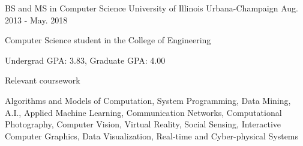 

\begin{cventries}

  \cventry
    {BS and MS in Computer Science} %
    {University of Illinois} %
    {Urbana-Champaign} %
    {Aug. 2013 - May. 2018} %
    {
      \begin{cvitems} %
        \item {Computer Science student in the College of Engineering}
        \item {Undergrad GPA: 3.83, Graduate GPA: 4.00}
      \end{cvitems}
    }

  \cventry
    {Relevant coursework} %
    {} %
    {} %
    {} %
    {
      \begin{cvitems} %
        \item {Algorithms and Models of Computation, System Programming, Data Mining, A.I., Applied Machine Learning, Communication Networks, Computational Photography, Computer Vision, Virtual Reality, Social Sensing, Interactive Computer Graphics, Data Visualization, Real-time and Cyber-physical Systems}
      \end{cvitems}
    }

\end{cventries}
